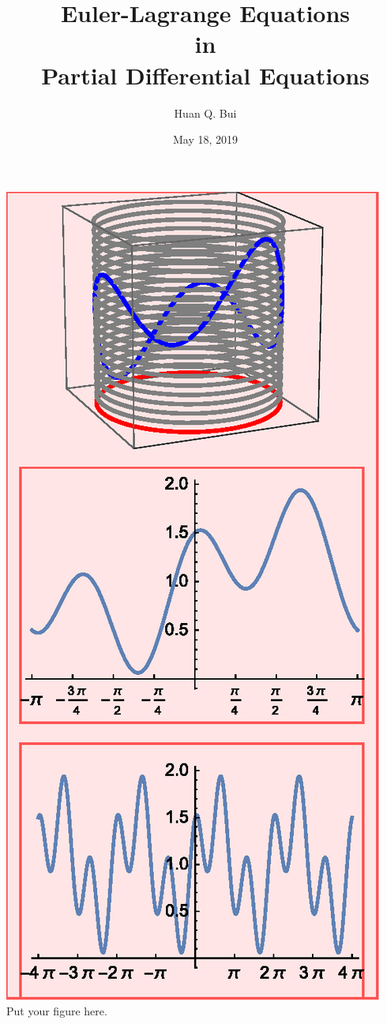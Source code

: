 \documentclass{article}
\title{Euler-Lagrange Equations\\in\\Partial Differential Equations}
\author{Huan Q. Bui}
\date{May 18, 2019}
\begin{document}
\maketitle
\begin{center}
\includegraphics[scale=1]{Figure.eps}\\

Put your figure here.
\end{center}
\end{document}
